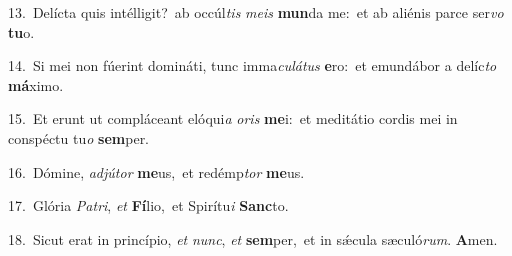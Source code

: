 {\numbfont\textcolor{\numbcolor}{13.}}~Delícta quis intélligit?~\dagger ab occúl\textit{tis} \textit{me}\-\textit{is} \textbf{mun}\-da me:~\star et ab aliénis parce ser\textit{vo} \textbf{tu}\-o.\par
{\numbfont\textcolor{\numbcolor}{14.}}~Si mei non fúerint domináti, tunc imma\-\textit{cu}\-\textit{lá}\textit{tus} \textbf{e}\-ro:~\star et emundábor a delíc\textit{to} \textbf{má}\-ximo.\par
{\numbfont\textcolor{\numbcolor}{15.}}~Et erunt ut compláceant elóqui\textit{a} \textit{o}\-\textit{ris} \textbf{me}\-i:~\star et meditátio cordis mei in conspéctu tu\textit{o} \textbf{sem}\-per.\par
{\numbfont\textcolor{\numbcolor}{16.}}~Dómine, \textit{ad}\-\textit{jú}\textit{tor} \textbf{me}\-us,~\star et redémp\textit{tor} \textbf{me}\-us.\par
{\numbfont\textcolor{\numbcolor}{17.}}~Glória \textit{Pa}\-\textit{tri}, \textit{et} \textbf{Fí}\-lio,~\star et Spirítu\textit{i} \textbf{Sanc}\-to.\par
{\numbfont\textcolor{\numbcolor}{18.}}~Sicut erat in princípio, \textit{et} \textit{nunc}\-, \textit{et} \textbf{sem}\-per,~\star et in sǽcula sæculó\-\textit{rum}\-. \textbf{A}\-men.\par
